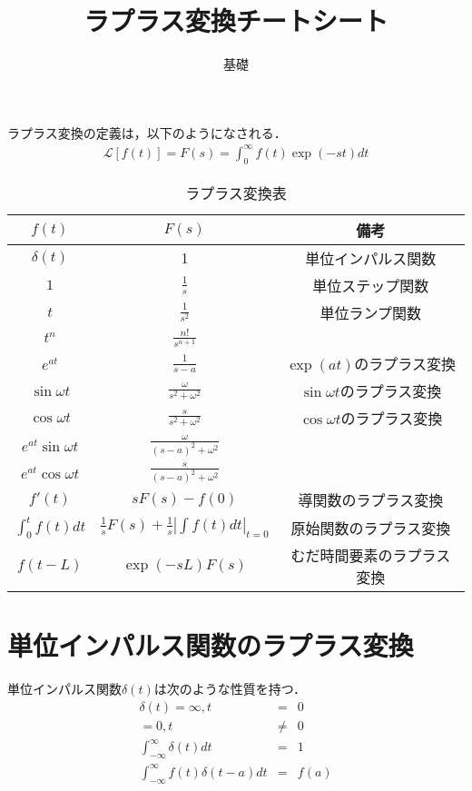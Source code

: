 \documentclass[a4paper, 12pt]{jsarticle}
\begin{document}
\title{ラプラス変換チートシート}
\author{基礎}
\maketitle

ラプラス変換の定義は，以下のようになされる．
\begin{eqnarray*}
    \mathcal{L} \left[f(t)\right] = F(s) = \int_0^\infty f(t) \exp(-st) dt
\end{eqnarray*}

\begin{table}[htbp]
    \centering
    \caption{ラプラス変換表}
    \label{figure}
    \begin{tabular}{ccc} \hline
        $f(t)$ & $F(s)$ & 備考 \\ \hline
        $\delta(t)$ & 1 & 単位インパルス関数 \\
        $1$    & $\frac1s$ &  単位ステップ関数 \\
        $t$    & $\frac1{s^2}$ & 単位ランプ関数 \\
        $t^n$ & $\frac{n!}{s^{n+1}}$ & \\
        $e^{at}$ & $\frac1{s-a}$ & $\exp(at)$のラプラス変換 \\
        $\sin \omega t$ & $\frac{\omega}{s^2+\omega^2}$ & $\sin \omega t$のラプラス変換 \\
        $\cos \omega t$ & $\frac{s}{s^2+\omega^2}$ & $\cos \omega t$のラプラス変換 \\
        $e^{at} \sin \omega t$ & $\frac{\omega}{(s-a)^2 + \omega^2}$ & \\
        $e^{at} \cos \omega t$ & $\frac{s}{(s-a)^2 + \omega^2}$ & \\
        $f'(t)$ & $sF(s) - f(0)$ & 導関数のラプラス変換 \\
        $\int_0^t f(t) dt$ & $\frac1s F(s) + \frac1s \left| \int f(t) dt \right|_{t = 0}$ & 原始関数のラプラス変換 \\
        $f(t-L)$ & $\exp(-sL)F(s)$ & むだ時間要素のラプラス変換 \\
        \hline
    \end{tabular}
\end{table}

\newpage

\section{単位インパルス関数のラプラス変換}
単位インパルス関数$\delta(t)$は次のような性質を持つ．
\begin{eqnarray}
\delta(t) = \infty, t &=& 0 \\ \nonumber
= 0, t &\neq& 0 \\
\int_{-\infty}^\infty \delta(t) dt &=& 1 \\
\int_{-\infty}^\infty f(t) \delta(t - a) dt &=& f(a)
\end{eqnarray}
\end{document}
